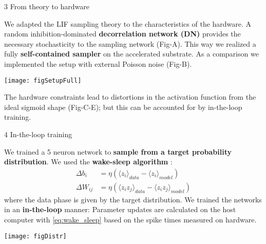 \begin{frame}
\begin{columns}
\begin{column}{0.99\textwidth}
\begin{columns}[t]
				\begin{column}{0.32\textwidth}


					\begin{block}{\large 3 From theory to hardware}
					\blockSpaceOne

					\begin{adjustwidth}{1.cm}{1.cm}
					\justifying
					We adapted the LIF sampling theory to the characteristics of the hardware.
					A random inhibition-dominated \textbf{decorrelation network (DN)} provides the necessary stochasticity to the sampling network (Fig-A).
					This way we realized a fully \textbf{self-contained sampler} on the accelerated substrate.
					As a comparison we implemented the setup with external Poisson noise (Fig-B).
					\end{adjustwidth}

					\secondBlockImSpace
					\begin{center}
						\texttt{[image: figSetupFull]}
					\end{center}
					\secondBlockImSpace

					\begin{adjustwidth}{1.cm}{1.cm}
					\justifying
					The hardware constraints lead to distortions in the activation function from the ideal sigmoid shape (Fig-C-E); but this can be accounted for by in-the-loop training.
					\end{adjustwidth}

					\blockSpaceOne
					\end{block}

					\interBlockSpaceOne

					\begin{block}{\large 4 In-the-loop training}
					\blockSpaceOne

					\begin{adjustwidth}{1.cm}{1.cm}
					\justifying
					We trained a 5 neuron network to \textbf{sample from a target probability distribution}.
					We used the \textbf{wake-sleep algorithm} \cite{ackley1987learning}:
					\secondBlockImSpace
					\begin{equation}\label{eq:wake_sleep}
						\begin{split}
						\Delta b_i &= \eta(\langle z_i \rangle_{data} - \langle z_i \rangle_{model}) \\
						\Delta W_{ij} &= \eta (\langle z_i z_j \rangle_{data} - \langle z_i z_j\rangle_{model})
						\end{split}
					\end{equation}
					\secondBlockImSpace
					where the data phase is given by the target distribution.
					We trained the networks in an \textbf{in-the-loop} manner: Parameter updates are calculated on the host computer with \cref{eq:wake_sleep} based on the spike times measured on hardware.
					\end{adjustwidth}
					\secondBlockImSpace
					\begin{center}
						\texttt{[image: figDistr]}
					\end{center}
					\secondBlockImSpace


\end{block}
\end{column}
\end{columns}
\end{column}
\end{columns}
\end{frame}
